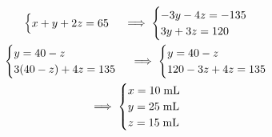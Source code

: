 \begin{soluzione}
\begin{gather*}
\begin{cases}
            x+y+2z=65
        \end{cases}
        \implies
        \begin{cases}
            -3y - 4z=-135\\
            3y+3z=120
        \end{cases}
        \\
        \begin{cases}
            y=40-z\\
            3(40-z) + 4z=135
        \end{cases}
        \implies
        \begin{cases}
            y=40-z\\
            120 - 3z + 4z=135
        \end{cases}
        \\
        \implies
        \begin{cases}
            x=10 \; \rm mL\\
            y=25 \; \rm mL\\
            z=15 \; \rm mL
        \end{cases}
    \end{gather*}
\end{soluzione}

\newpage

